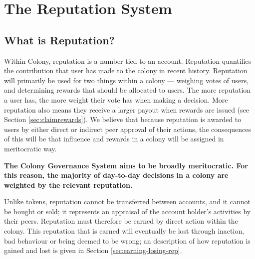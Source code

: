 \section{The Reputation System}\label{sec:reputation}
\subsection{What is Reputation?}\label{subsec:what-is-reputation}

Within Colony, reputation is a number tied to an account. Reputation quantifies the contribution that user has made to the colony in recent history. Reputation will primarily be used for two things within a colony --- weighing votes of users, and determining rewards that should be allocated to users. The more reputation a user has, the more weight their vote has when making a decision. More reputation also means they receive a larger payout when rewards are issued (see Section \ref{sec:claimrewards}). We believe that because reputation is awarded to users by either direct or indirect peer approval of their actions, the consequences of this will be that influence and rewards in a colony will be assigned in meritocratic way.

\textbf{The Colony Governance System aims to be broadly meritocratic. For this reason, the majority of day-to-day decisions in a colony are weighted by the relevant reputation.} %

Unlike tokens, reputation cannot be transferred between accounts, and it cannot be bought or sold; it represents an appraisal of the account holder's activities by their peers. Reputation must therefore be earned by direct action within the colony. This reputation that is earned will eventually be lost through inaction, bad behaviour or being deemed to be wrong; an description of how reputation is gained and lost is given in Section \ref{sec:earning-losing-rep}. 




